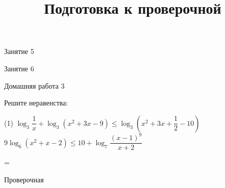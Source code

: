 \begin{class}[number=5]
	\begin{listofex}
		\item Занятие 5
	\end{listofex}
\end{class}

\begin{class}[number=6]
	\begin{listofex}
		\item Занятие 6
	\end{listofex}
\end{class}

\begin{homework}[number=3]
	\begin{listofex}
		\item Домашняя работа 3
	\end{listofex}
\end{homework}

\begin{class}[number=7]
	\title{Подготовка к проверочной}
	\begin{listofex}
		\item Решите неравенства:
	\begin{tasks}(1)
		\task \( \log_3 \dfrac{1}{x} + \log_3 (x^2+3x-9) \le \log_3 \left( x^2+3x+\dfrac{1}{2}-10 \right)  \)
		\task \( 9\log_6 (x^2+x-2) \le 10 + \log_7 \dfrac{(x-1)^9}{x+2} \)
	\end{tasks}
	\end{listofex}
\end{class}

=%
\begin{exam}
	\begin{listofex}
		\item Проверочная
	\end{listofex}
\end{exam}
